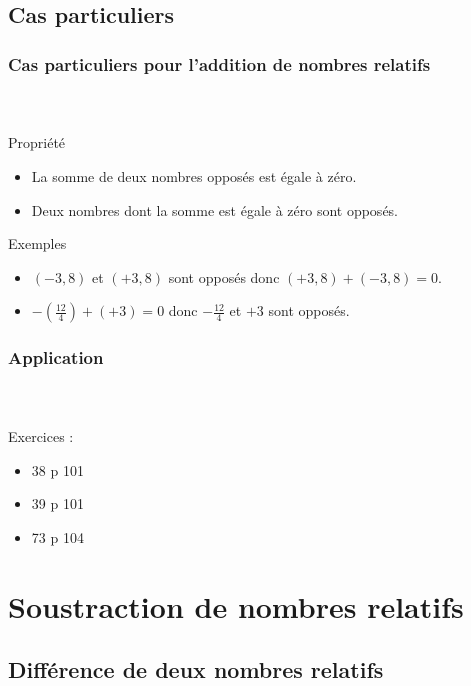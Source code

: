 \documentclass{beamer}
\begin{document}
\subsection{Cas particuliers}
\begin{frame}
	\frametitle{Cas particuliers pour l'addition de nombres relatifs}  
	\framesubtitle{ \ }	
	
	\begin{block}{Propriété}
		\begin{itemize}
			\item La somme de deux nombres opposés est égale à zéro.
			\item Deux nombres dont la somme est égale à zéro sont opposés.\pause
		\end{itemize}
	\end{block}
	
	\begin{exampleblock}{Exemples}
		\begin{itemize}
			\item $(-3,8)$  et $(+3,8)$ sont opposés donc $(+3,8) + (-3,8) = 0$.
			\item $-(\frac{12}{4}) + (+3) = 0$ donc $-\frac{12}{4}$  et $+3$ sont opposés.
		\end{itemize}
	\end{exampleblock}
	
\end{frame}

\begin{frame}
	\frametitle{Application}  
	\framesubtitle{ \ }	
	
	Exercices :
	\begin{itemize}
		\item 38 p 101
		\item 39 p 101
		\item 73 p 104
	\end{itemize}
\end{frame}

\section{Soustraction de nombres relatifs}

\subsection{Différence de deux nombres relatifs}
\end{document}
